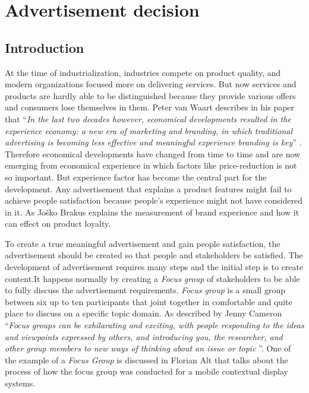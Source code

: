 \chapter{Advertisement decision} %

\label{Chapter4} %
\newpage



\section{Introduction}
At the time of industrialization, industries compete on product quality, and modern organizations focused more on delivering services. But now services and products are hardly able to be distinguished because they provide various offers and consumers lose themselves in them. Peter van Waart describes in his paper that ``\emph{In the last two decades however, economical developments resulted in the experience economy: a new era of marketing and branding, in which traditional advertising is becoming less effective and meaningful experience branding is key}'' \cite{Meaningful_ad}.  Therefore economical developments have changed from time to time and are now emerging from economical experience in which factors like price-reduction is not so important. But experience factor has become the central part for the development. Any advertisement that explains a product features might fail to achieve people satisfaction because people’s experience might not have considered in it. As Joško Brakus \cite{Brand_experience} explains the measurement of brand experience and how it can effect on product loyalty.

To create a true meaningful advertisement and gain people satisfaction, the advertisement should be created so that people and stakeholders be satisfied.
The development of advertisement requires many steps and the initial step is to create content.It happens normally by creating a \emph{Focus group} of stakeholders to be able to fully discuss the advertisement requirements. \emph{Focus group} is a small group between six up to ten participants that joint together in comfortable and quite place to discuss on a specific topic domain. As described by Jenny Cameron ``\emph{Focus groups can be exhilarating and exciting, with people responding to the ideas and viewpoints expressed by others, and introducing you, the researcher, and other group members to new ways of thinking about an issue or topic }''\cite{FocusGroup}. One of the example of a \emph{Focus Group} is discussed in Florian Alt \cite{mobile_focus_group} that talks about the process of how the focus group was conducted for a mobile contextual display systems.


